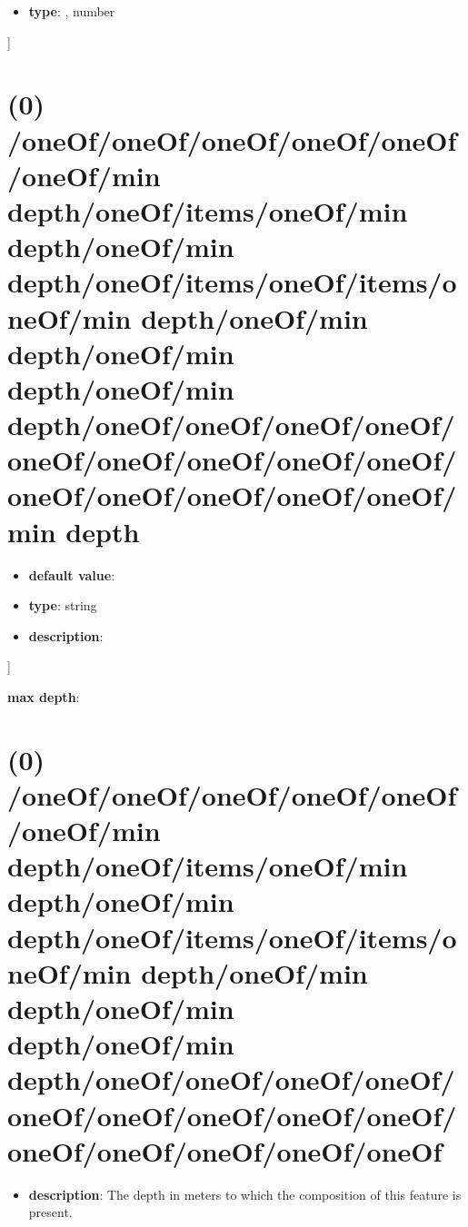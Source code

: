 \begin{itemize}[leftmargin=5em]\item {\bf type}: , number\end{itemize}]\section{(0) /oneOf/oneOf/oneOf/oneOf/oneOf/oneOf/min depth/oneOf/items/oneOf/min depth/oneOf/min depth/oneOf/items/oneOf/items/oneOf/min depth/oneOf/min depth/oneOf/min depth/oneOf/min depth/oneOf/oneOf/oneOf/oneOf/oneOf/oneOf/oneOf/oneOf/oneOf/oneOf/oneOf/oneOf/oneOf/oneOf/min depth}
\begin{itemize}[leftmargin=0em]\item {\bf default value}: 
\item {\bf type}: string
\item {\bf description}: 
\end{itemize}]\item {\bf max depth}: \section{(0) /oneOf/oneOf/oneOf/oneOf/oneOf/oneOf/min depth/oneOf/items/oneOf/min depth/oneOf/min depth/oneOf/items/oneOf/items/oneOf/min depth/oneOf/min depth/oneOf/min depth/oneOf/min depth/oneOf/oneOf/oneOf/oneOf/oneOf/oneOf/oneOf/oneOf/oneOf/oneOf/oneOf/oneOf/oneOf/oneOf}
\begin{itemize}[leftmargin=0em]\item {\bf description}: The depth in meters to which the composition of this feature is present.
\end{itemize}
